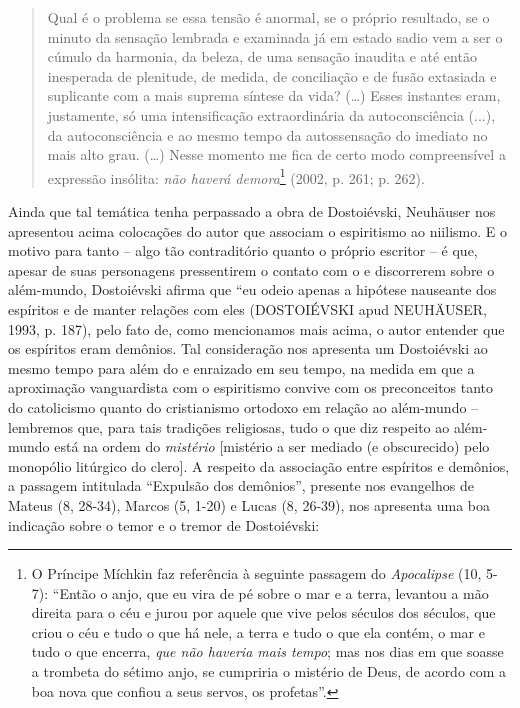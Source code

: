 \begin{quote}
Qual é o problema se essa tensão é anormal, se o próprio resultado, se o
minuto da sensação lembrada e examinada já em estado sadio vem a ser o
cúmulo da harmonia, da beleza, de uma sensação inaudita e até então
inesperada de plenitude, de medida, de conciliação e de fusão extasiada
e suplicante com a mais suprema síntese da vida? (\ldots{}) Esses
instantes eram, justamente, só uma intensificação extraordinária da
autoconsciência (...), da autoconsciência e ao mesmo tempo da
autossensação do imediato no mais alto grau. (\ldots{}) Nesse momento me
fica de certo modo compreensível a expressão insólita: \emph{não haverá
demora}\footnote{O Príncipe Míchkin faz referência à seguinte passagem
  do \emph{Apocalipse} (10, 5-7): ``Então o anjo, que eu vira de pé
  sobre o mar e a terra, levantou a mão direita para o céu e jurou por
  aquele que vive pelos séculos dos séculos, que criou o céu e tudo o
  que há nele, a terra e tudo o que ela contém, o mar e tudo o que
  encerra, \emph{que não haveria mais tempo}; mas nos dias em que soasse
  a trombeta do sétimo anjo, se cumpriria o mistério de Deus, de acordo
  com a boa nova que confiou a seus servos, os profetas''.} (2002, p.
261; p. 262).
\end{quote}

Ainda que tal temática tenha perpassado a obra de Dostoiévski, Neuhäuser
nos apresentou acima colocações do autor que associam o espiritismo ao
niilismo. E o motivo para tanto -- algo tão contraditório quanto o
próprio escritor -- é que, apesar de suas personagens pressentirem o
contato com o e discorrerem sobre o além-mundo, Dostoiévski afirma que
``eu odeio apenas a hipótese nauseante dos espíritos e de manter
relações com eles (DOSTOIÉVSKI apud NEUHÄUSER, 1993, p. 187), pelo fato
de, como mencionamos mais acima, o autor entender que os espíritos eram
demônios. Tal consideração nos apresenta um Dostoiévski ao mesmo tempo
para além do e enraizado em seu tempo, na medida em que a aproximação
vanguardista com o espiritismo convive com os preconceitos tanto do
catolicismo quanto do cristianismo ortodoxo em relação ao além-mundo --
lembremos que, para tais tradições religiosas, tudo o que diz respeito
ao além-mundo está na ordem do \emph{mistério} {[}mistério a ser mediado
(e obscurecido) pelo monopólio litúrgico do clero{]}. A respeito da
associação entre espíritos e demônios, a passagem intitulada ``Expulsão
dos demônios'', presente nos evangelhos de Mateus (8, 28-34), Marcos (5,
1-20) e Lucas (8, 26-39), nos apresenta uma boa indicação sobre o temor
e o tremor de Dostoiévski:

